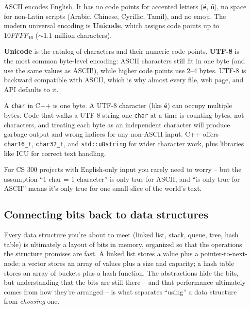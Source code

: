 \documentclass[11pt]{article}
\begin{document}
ASCII encodes English. It has no code points for accented letters
(\texttt{é}, \texttt{ñ}), no space for non-Latin scripts (Arabic,
Chinese, Cyrillic, Tamil), and no emoji. The modern universal encoding
is \textbf{Unicode}, which assigns code points up to $10FFFF_{16}$
($\sim 1.1$ million characters).

\begin{defnbox}
\textbf{Unicode} is the catalog of characters and their numeric code
points. \textbf{UTF-8} is the most common byte-level encoding: ASCII
characters still fit in one byte (and use the same values as ASCII!),
while higher code points use 2--4 bytes. UTF-8 is backward compatible
with ASCII, which is why almost every file, web page, and API
defaults to it.
\end{defnbox}

\begin{warnbox}
A \texttt{char} in C++ is one byte. A UTF-8 character (like
\texttt{é}) can occupy multiple bytes. Code that walks a UTF-8 string
one \texttt{char} at a time is counting bytes, not characters, and
treating each byte as an independent character will produce garbage
output and wrong indices for any non-ASCII input. C++ offers
\texttt{char16\_t}, \texttt{char32\_t}, and \texttt{std::u8string} for
wider character work, plus libraries like ICU for correct text
handling.

For CS 300 projects with English-only input you rarely need to worry
-- but the assumption ``1 char = 1 character'' is only true for
ASCII, and ``is only true for ASCII'' means it's only true for one
small slice of the world's text.
\end{warnbox}

\subsection{Connecting bits back to data structures}

Every data structure you're about to meet (linked list, stack, queue,
tree, hash table) is ultimately a layout of bits in memory, organized
so that the operations the structure promises are fast. A linked list
stores a value plus a pointer-to-next-node; a vector stores an array
of values plus a size and capacity; a hash table stores an array of
buckets plus a hash function. The abstractions hide the bits, but
understanding that the bits are still there -- and that performance
ultimately comes from how they're arranged -- is what separates
``using'' a data structure from \emph{choosing} one.
\end{document}
